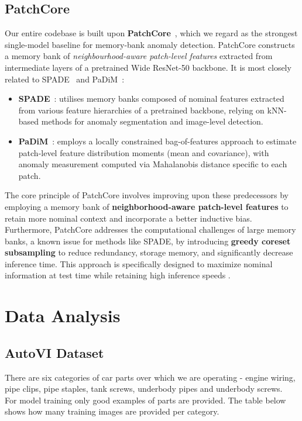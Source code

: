 \documentclass{article}
\begin{document}
\subsection{PatchCore}

Our entire codebase is built upon \textbf{PatchCore}~\citep{Roth2022TotalRecall},
which we regard as the strongest single-model baseline for memory-bank
anomaly detection. PatchCore constructs a memory bank of
\emph{neighbourhood-aware patch-level features} extracted from
intermediate layers of a pretrained Wide ResNet-50 backbone.
It is most closely related to SPADE~\cite{Cohen2020} and PaDiM~\cite{Defard2021}:

\begin{itemize}
    \item \textbf{SPADE}~\cite{Cohen2020}: utilises memory banks
    composed of nominal features extracted from various feature hierarchies
    of a pretrained backbone, relying on kNN-based methods for anomaly
    segmentation and image-level detection.
    \item \textbf{PaDiM}~\cite{Defard2021}: employs a locally constrained
    bag-of-features approach to estimate patch-level feature distribution
    moments (mean and covariance), with anomaly measurement computed via
    Mahalanobis distance specific to each patch.
\end{itemize}

The core principle of PatchCore involves improving upon these predecessors by employing a memory bank of \textbf{neighborhood-aware patch-level features} to retain more nominal context and incorporate a better inductive bias. Furthermore, PatchCore addresses the computational challenges of large memory banks, a known issue for methods like SPADE, by introducing \textbf{greedy coreset subsampling} to reduce redundancy, storage memory, and significantly decrease inference time. This approach is specifically designed to maximize nominal information at test time while retaining high inference speeds \citep{Roth2022TotalRecall}.

\section{Data Analysis}

\subsection{AutoVI Dataset}

There are six categories of car parts over which we are operating - engine wiring, pipe clips, pipe staples, tank screws, underbody pipes and underbody screws.
\\
For model training only good examples of parts are provided. The table below shows how many training images are provided per category.
\\
\end{document}
